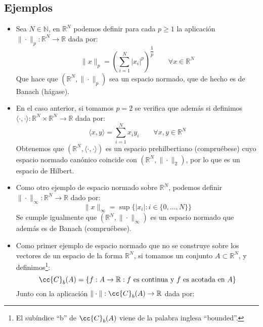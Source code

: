 \subsection{Ejemplos}
\begin{itemize}
    \item Sea $N\in \mathbb{N}$, en $\mathbb{R}^N$ podemos definir para cada $p\geq 1$ la aplicación\newline $\|\cdot \|_p:\mathbb{R}^N\to \mathbb{R}$ dada por:
        \begin{equation*}
            \|x\|_p = {\left(\sum_{i=1}^{N}|x_i|^p\right)}^{\dfrac{1}{p}} \qquad \forall x\in \mathbb{R}^N
        \end{equation*}
        Que hace que $(\mathbb{R}^N, \|\cdot \|_p)$ sea un espacio normado, que de hecho es de Banach (hágase). %
    \item En el caso anterior, si tomamos $p=2$ se verifica que además si definimos $\langle \cdot ,\cdot  \rangle :\mathbb{R}^N\times \mathbb{R}^N\to \mathbb{R}$ dada por:
        \begin{equation*}
            \langle x,y \rangle  = \sum_{i=1}^{N} x_iy_i \qquad \forall x,y\in \mathbb{R}^N
        \end{equation*}
        Obtenemos que $(\mathbb{R}^N,\langle \cdot ,\cdot  \rangle )$ es un espacio prehilbertiano (compruébese) cuyo espacio normado canónico coincide con $(\mathbb{R}^N,\|\cdot \|_2)$, por lo que es un espacio de Hilbert.
    \item Como otro ejemplo de espacio normado sobre $\mathbb{R}^N$, podemos definir $\|\cdot \|_\infty:\mathbb{R}^N\to \mathbb{R}$ dado por:
        \begin{equation*}
            \|x\|_\infty = \sup \{|x_i| : i \in \{0,\ldots, N\}\}
        \end{equation*}
        Se cumple igualmente que $(\mathbb{R}^N,\|\cdot \|_\infty)$ es un espacio normado que además es de Banach (compruébese).
    \item Como primer ejemplo de espacio normado que no se construye sobre los vectores de un espacio de la forma $\mathbb{R}^N$, si tomamos un conjunto $A\subset \mathbb{R}^N$, y definimos\footnote{El subíndice ``b'' de $\cc{C}_b(A)$ viene de la palabra inglesa ``bounded''.}:
        \begin{equation*}
            \cc{C}_b(A) = \{f:A\to \mathbb{R} : f \text{\ es continua y } f \text{\ es acotada en\ } A\}
        \end{equation*}
        Junto con la aplicación $\|\cdot \|:\cc{C}_b(A)\to \mathbb{R}$ dada por:

\end{itemize}
